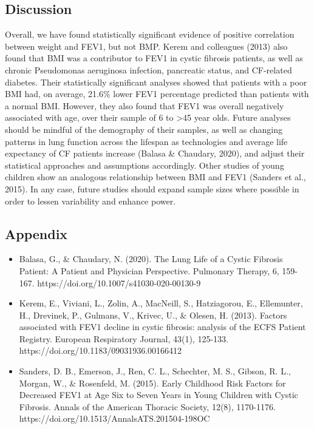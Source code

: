 \documentclass{article}
\begin{document}
		\subsection*{Discussion}
		Overall, we have found statistically significant evidence of positive correlation between weight and FEV1, but not BMP. Kerem and colleagues (2013) also found that BMI was a contributor to FEV1 in cystic fibrosis patients, as well as chronic Pseudomonas aeruginosa infection, pancreatic status, and CF-related diabetes. Their statistically significant analyses showed that patients with a poor BMI had, on average, 21.6\% lower FEV1 percentage predicted than patients with a normal BMI. However, they also found that FEV1 was overall negatively associated with age, over their sample of 6 to >45 year olds. Future analyses should be mindful of the demography of their samples, as well as changing patterns in lung function across the lifespan as technologies and average life expectancy of CF patients increase (Balasa \& Chaudary, 2020), and adjust their statistical approaches and assumptions accordingly. Other studies of young children show an analogous relationship between BMI and FEV1 (Sanders et al., 2015). In any case, future studies should expand sample sizes where possible in order to lessen variability and enhance power.
		
		\newpage
		\subsection*{Appendix}
		\begin{itemize}
			\item Balasa, G., \& Chaudary, N. (2020). The Lung Life of a Cystic Fibrosis Patient: A Patient and Physician Perspective. Pulmonary Therapy, 6, 159-167. 
			https://doi.org/10.1007/s41030-020-00130-9
			\item Kerem, E., Viviani, L., Zolin, A., MacNeill, S., Hatziagorou, E., Ellemunter, H., Drevinek, P., Gulmans, V., Krivec, U., \& Olesen, H. (2013). Factors associated with FEV1 decline in cystic fibrosis: analysis of the ECFS Patient Registry. European Respiratory Journal, 43(1), 125-133. 
			https://doi.org/10.1183/09031936.00166412
			\item Sanders, D. B., Emerson, J., Ren, C. L., Schechter, M. S., Gibson, R. L., Morgan, W., \& Rosenfeld, M. (2015). Early Childhood Risk Factors for Decreased FEV1 at Age Six to Seven Years in Young Children with Cystic Fibrosis. Annals of the American Thoracic Society, 12(8), 1170-1176. 
			https://doi.org/10.1513/AnnalsATS.201504-198OC
		\end{itemize}
\end{document}
